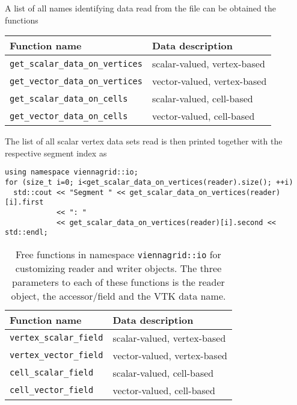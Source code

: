  A list of all names identifying data read from the file can be obtained the functions
 \begin{center}
  \begin{tabular}{|l|l|}
   \hline
   Function name & Data description \\
   \hline
   \lstinline|get_scalar_data_on_vertices| & scalar-valued, vertex-based \\
   \lstinline|get_vector_data_on_vertices| & vector-valued, vertex-based \\
   \hline
   \lstinline|get_scalar_data_on_cells| & scalar-valued, cell-based \\
   \lstinline|get_vector_data_on_cells| & vector-valued, cell-based \\
   \hline
  \end{tabular}
 \end{center}

 The list of all scalar vertex data sets read is then printed together with the respective segment index as
 \begin{lstlisting}
using namespace viennagrid::io;
for (size_t i=0; i<get_scalar_data_on_vertices(reader).size(); ++i)
  std::cout << "Segment " << get_scalar_data_on_vertices(reader)[i].first
            << ": "
            << get_scalar_data_on_vertices(reader)[i].second << std::endl;
 \end{lstlisting}



 \begin{table}[tb]
 \begin{center}
  \begin{tabular}{|l|l|}
   \hline
   Function name & Data description \\
   \hline
   \lstinline|vertex_scalar_field| & scalar-valued, vertex-based \\
   \lstinline|vertex_vector_field| & vector-valued, vertex-based \\
   \hline
   \lstinline|cell_scalar_field| & scalar-valued, cell-based \\
   \lstinline|cell_vector_field| & vector-valued, cell-based \\
   \hline
  \end{tabular}
 \end{center}
 \caption{Free functions in namespace \lstinline|viennagrid::io| for customizing reader and writer objects. The three parameters to each of these functions is the reader object, the accessor/field and the VTK data name.}
 \label{tab:io-field-obtaining}
 \end{table}

